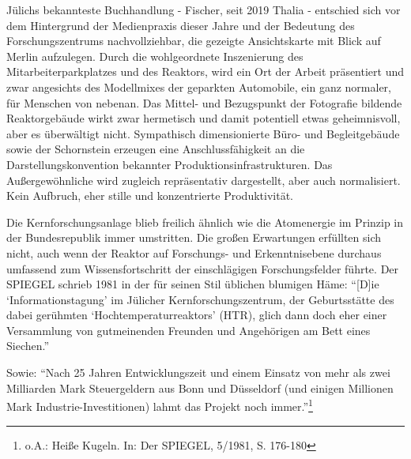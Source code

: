 \documentclass[a4paper,
fontsize=11pt,
oneside,
numbers=noperiodatend,
parskip=half-,
bibliography=totoc,
final
]{scrartcl}
\begin{document}
Jülichs bekannteste Buchhandlung - Fischer, seit 2019 Thalia - entschied
sich vor dem Hintergrund der Medienpraxis dieser Jahre und der Bedeutung
des Forschungszentrums nachvollziehbar, die gezeigte Ansichtskarte mit
Blick auf Merlin aufzulegen. Durch die wohlgeordnete Inszenierung des
Mitarbeiterparkplatzes und des Reaktors, wird ein Ort der Arbeit
präsentiert und zwar angesichts des Modellmixes der geparkten
Automobile, ein ganz normaler, für Menschen von nebenan. Das Mittel- und
Bezugspunkt der Fotografie bildende Reaktorgebäude wirkt zwar hermetisch
und damit potentiell etwas geheimnisvoll, aber es überwältigt nicht.
Sympathisch dimensionierte Büro- und Begleitgebäude sowie der
Schornstein erzeugen eine Anschlussfähigkeit an die
Darstellungskonvention bekannter Produktionsinfrastrukturen. Das
Außergewöhnliche wird zugleich repräsentativ dargestellt, aber auch
normalisiert. Kein Aufbruch, eher stille und konzentrierte
Produktivität.

Die Kernforschungsanlage blieb freilich ähnlich wie die Atomenergie im
Prinzip in der Bundesrepublik immer umstritten. Die großen Erwartungen
erfüllten sich nicht, auch wenn der Reaktor auf Forschungs- und
Erkenntnisebene durchaus umfassend zum Wissensfortschritt der
einschlägigen Forschungsfelder führte. Der SPIEGEL schrieb 1981 in der
für seinen Stil üblichen blumigen Häme: \enquote{{[}D{]}ie
\enquote{Informationstagung} im Jülicher Kernforschungszentrum, der
Geburtsstätte des dabei gerühmten \enquote{Hochtemperaturreaktors}
(HTR), glich dann doch eher einer Versammlung von gutmeinenden Freunden
und Angehörigen am Bett eines Siechen.}

Sowie: \enquote{Nach 25 Jahren Entwicklungszeit und einem Einsatz von
mehr als zwei Milliarden Mark Steuergeldern aus Bonn und Düsseldorf (und
einigen Millionen Mark Industrie-Investitionen) lahmt das Projekt noch
immer.}\footnote{o.A.: Heiße Kugeln. In: Der SPIEGEL, 5/1981, S. 176-180}
\end{document}
